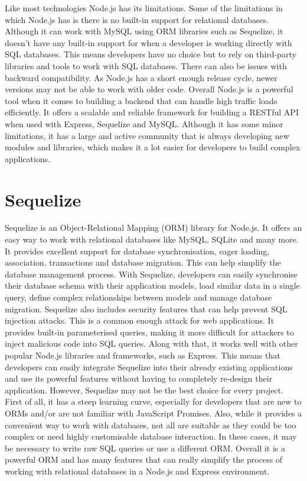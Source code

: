 Like most technologies Node.js has its limitations. Some of the limitations in which Node.js has is there is no built-in support for relational databases. Although it can work with MySQL using ORM libraries such as Sequelize, it doesn’t have any built-in support for when a developer is working directly with SQL databases. This means developers have no choice but to rely on third-party libraries and tools to work with SQL databases. There can also be issues with backward compatibility. As Node.js has a short enough release cycle, newer versions may not be able to work with older code.  
\newline \newline
Overall Node.js is a powerful tool when it comes to building a backend that can handle high traffic loads efficiently. It offers a scalable and reliable framework for building a RESTful API when used with Express, Sequelize and MySQL. Although it has some minor limitations, it has a large and active community that is always developing new modules and libraries, which makes it a lot easier for developers to build complex applications.



\section{Sequelize}
Sequelize is an Object-Relational Mapping (ORM) library for Node.js. \cite{sequel} It offers an easy way to work with relational databases like MySQL, SQLite and many more. It provides excellent support for database synchronisation, eager loading, association, transactions and database migration. This can help simplify the database management process. With Sequelize, developers can easily synchronise their database schema with their application models, load similar data in a single query, define complex relationships between models and manage database migration.
Sequelize also includes security features that can help prevent SQL injection attacks. This is a common enough attack for web applications. It provides built-in parameterised queries, making it more difficult for attackers to inject malicious code into SQL queries. Along with that, it works well with other popular Node.js libraries and frameworks, such as Express. This means that developers can easily integrate Sequelize into their already existing applications and use its powerful features without having to completely re-design their application.
However, Sequelize may not be the best choice for every project. First of all, it has a steep learning curve, especially for developers that are new to ORMs and/or are not familiar with JavaScript Promises. Also, while it provides a convenient way to work with databases, not all are suitable as they could be too complex or need highly customisable database interaction. In these cases, it may be necessary to write raw SQL queries or use a different ORM.
Overall it is a powerful ORM and has many features that can really simplify the process of working with relational databases in a Node.js and Express environment. 




